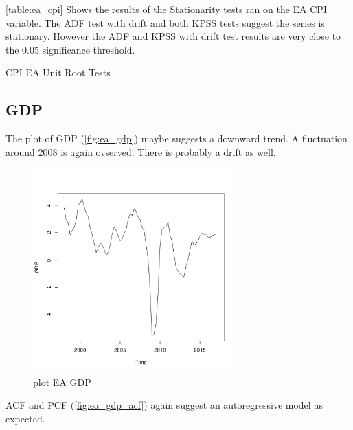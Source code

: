 \documentclass[10pt]{article}
\begin{document}
\autoref{table:ea_cpi} Shows the results of the Stationarity tests ran on the EA CPI variable. The ADF test with drift and both KPSS tests suggest the series is stationary. However the ADF and KPSS with drift test results are very close to the 0.05 significance threshold. 

\begin{table}[h!]
\centering
{}
\caption{CPI EA Unit Root Tests}
\label{table:ea_cpi}
\end{table}



\subsection{GDP}

The plot of GDP (\autoref{fig:ea_gdp}) maybe suggests a downward trend. A fluctuation around 2008 is again ovserved. There is probably a drift as well.

\begin{figure}[h!]
\centering
\includegraphics[width = 0.7\textwidth]{../plots/ea_GDP}
\caption{plot EA GDP}
\label{fig:ea_gdp}
\end{figure}

ACF and PCF (\autoref{fig:ea_gdp_acf}) again suggest an autoregressive model as expected.
\end{document}
